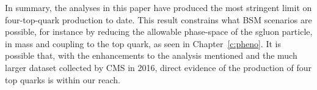 In summary, the analyses in this paper have produced the most stringent limit on four-top-quark production to date. This result constrains what BSM scenarios are possible, for instance by reducing the allowable phase-space of the sgluon particle, in mass and coupling to the top quark, as seen in Chapter~\ref{c:pheno}. It is possible that, with the enhancements to the analysis mentioned and the much larger dataset collected by CMS in 2016, direct evidence of the production of four top quarks is within our reach.



